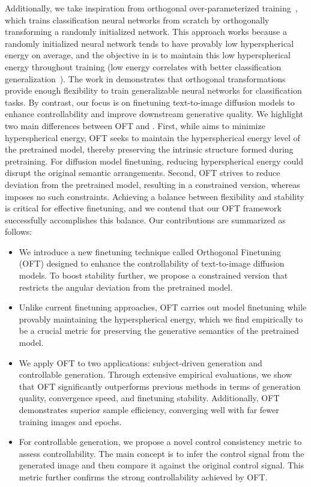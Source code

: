 Additionally, we take inspiration from orthogonal over-parameterized training~\cite{liu2021orthogonal}, which trains classification neural networks from scratch by orthogonally transforming a randomly initialized network. This approach works because a randomly initialized neural network tends to have provably low hyperspherical energy on average, and the objective in \cite{liu2021orthogonal} is to maintain this low hyperspherical energy throughout training (low energy correlates with better classification generalization~\cite{liu2018learning,lin2020regularizing}). The work in \cite{liu2021orthogonal} demonstrates that orthogonal transformations provide enough flexibility to train generalizable neural networks for classification tasks. By contrast, our focus is on finetuning text-to-image diffusion models to enhance controllability and improve downstream generative quality. We highlight two main differences between OFT and \cite{liu2021orthogonal}. First, while \cite{liu2021orthogonal} aims to minimize hyperspherical energy, OFT seeks to maintain the hyperspherical energy level of the pretrained model, thereby preserving the intrinsic structure formed during pretraining. For diffusion model finetuning, reducing hyperspherical energy could disrupt the original semantic arrangements. Second, OFT strives to reduce deviation from the pretrained model, resulting in a constrained version, whereas \cite{liu2021orthogonal} imposes no such constraints. Achieving a balance between flexibility and stability is critical for effective finetuning, and we contend that our OFT framework successfully accomplishes this balance. Our contributions are summarized as follows:

\begin{itemize}[leftmargin=*,nosep]

    \item We introduce a new finetuning technique called Orthogonal Finetuning (OFT) designed to enhance the controllability of text-to-image diffusion models. To boost stability further, we propose a constrained version that restricts the angular deviation from the pretrained model.
    \item Unlike current finetuning approaches, OFT carries out model finetuning while provably maintaining the hyperspherical energy, which we find empirically to be a crucial metric for preserving the generative semantics of the pretrained model.
    \item We apply OFT to two applications: subject-driven generation and controllable generation. Through extensive empirical evaluations, we show that OFT significantly outperforms previous methods in terms of generation quality, convergence speed, and finetuning stability. Additionally, OFT demonstrates superior sample efficiency, converging well with far fewer training images and epochs.
    \item For controllable generation, we propose a novel control consistency metric to assess controllability. The main concept is to infer the control signal from the generated image and then compare it against the original control signal. This metric further confirms the strong controllability achieved by OFT.
\end{itemize}

